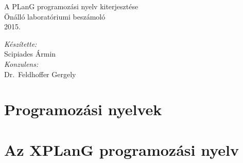 \documentclass[11pt,a4paper]{article}
\theoremstyle{plain}
\begin{document}
\begin{titlepage}
\newlength\drop
\setlength\drop{0.08\textheight}

\centering
\vspace*{2\drop}

{\huge A PLanG programozási nyelv kiterjesztése}\\[\baselineskip]
{Önálló laboratóriumi beszámoló}\\[\baselineskip]

\vspace*{0.5\drop}
\large 2015.

\vfill
\begin{flushright} \large
\emph{Készítette:}\\
Scipiades Ármin\\[\baselineskip]
\emph{Konzulens:} \\
Dr.~Feldhoffer Gergely
\end{flushright}
\vspace*{\drop}

\end{titlepage}

\newpage
\section{Programozási nyelvek}
\label{sec:proglang}


\newpage
\section{Az XPLanG programozási nyelv}
\label{sec:xplang}



\newpage
\printbibliography
\end{document}
